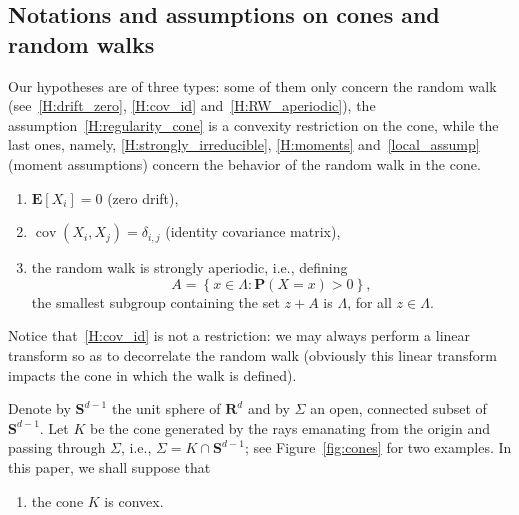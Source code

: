 \documentclass[10pt]{amsart}
\theoremstyle{definition}\newtheorem{defi}[theo]{Definition}\newtheorem{rema}[theo]{Remark}\newtheorem{exam}[theo]{Example}\newtheorem{exem}[theo]{Example}\newtheorem{nota}[theo]{Notation}
\DeclareMathOperator{\cov}{cov}
\newcommand{\pr}{\mathbf{P}}
\newcommand{\e}{\mathbf{E}}
\newcommand{\bfS}{\mathbf{S}}
\newcommand{\bfR}{\mathbf{R}}
\newcommand*{\relabel}{\renewcommand{\labelenumi}{(\theenumi)}}
\newcommand*{\Henumi}{\renewcommand*{\theenumi}{H\arabic{enumi}}\relabel}
\begin{document}
\subsection*{Notations and assumptions on cones and random walks}
Our hypotheses are of three types: some of them only concern the random walk (see~\eqref{H:drift_zero}, \eqref{H:cov_id} and~\eqref{H:RW_aperiodic}), the assumption~\eqref{H:regularity_cone} is a convexity restriction on the cone, while the last ones, namely, \eqref{H:strongly_irreducible}, \eqref{H:moments} and~\eqref{local_assump} (moment assumptions) concern the behavior of the random walk in the cone.
\begin{enumerate}\Henumi
\item\label{H:drift_zero}
$\e[X_{i}]=0$ (zero drift),
\item\label{H:cov_id}
$\cov(X_{i},X_{j})=\delta_{i,j}$ (identity covariance matrix),
\item\label{H:RW_aperiodic}
the random walk is strongly aperiodic, i.e., defining
\[
A= \left\{ x\in \Lambda: \pr(X=x)>0\right\}\!,
\]
the smallest subgroup containing the set $z+A$ is $\Lambda$, for all $z\in\Lambda$.
\end{enumerate}
Notice that~\eqref{H:cov_id} is not a restriction: we may always perform a linear transform so as to decorrelate the random walk (obviously this linear transform impacts the cone in which the walk is defined).

Denote by $\bfS^{d-1}$ the unit sphere of $\bfR^d$ and by $\Sigma$ an open, connected subset of $\bfS^{d-1}$. Let $K$ be the cone generated by the rays emanating from the origin and passing through $\Sigma$, i.e., $\Sigma=K\cap \bfS^{d-1}$; see Figure~\ref{fig:cones} for two examples. In this paper, we shall suppose that
\begin{enumerate}\Henumi
\setcounter{enumi}{3}
\item\label{H:regularity_cone}
the cone $K$ is convex.
\end{enumerate}
\end{document}
